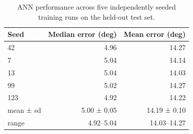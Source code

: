 \begin{table}[h!]
    \centering
    \caption{ANN performance across five independently seeded training runs on the held-out test set.}
    \label{tab:multiseed}
    \begin{tabular}{@{}lrr@{}}
        \toprule
        Seed & Median error (deg) & Mean error (deg) \\
        \midrule
        42 & 4.96 & 14.27 \\
        7 & 5.04 & 14.14 \\
        13 & 5.04 & 14.03 \\
        99 & 5.02 & 14.27 \\
        123 & 4.92 & 14.22 \\
        mean ± sd & 5.00 ± 0.05 & 14.19 ± 0.10 \\
        range & 4.92–5.04 & 14.03–14.27 \\
        \bottomrule
    \end{tabular}
\end{table}

